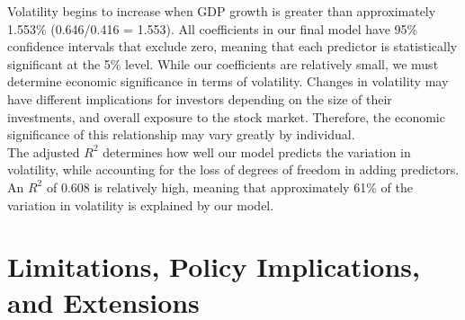 Volatility begins to increase when GDP growth is greater than approximately 1.553\% (0.646/0.416 = 1.553). All coefficients in our final model have 95\% confidence intervals that exclude zero, meaning that each predictor is statistically significant at the 5\% level. While our coefficients are relatively small, we must determine economic significance in terms of volatility. Changes in volatility may have different implications for investors depending on the size of their investments, and overall exposure to the stock market. Therefore, the economic significance of this relationship may vary greatly by individual. \\
\indent The adjusted $R^2$ determines how well our model predicts the variation in volatility, while accounting for the loss of degrees of freedom in adding predictors. An $R^2$ of 0.608 is relatively high, meaning that approximately 61\% of the variation in volatility is explained by our model. 

\section{Limitations, Policy Implications, and Extensions}
